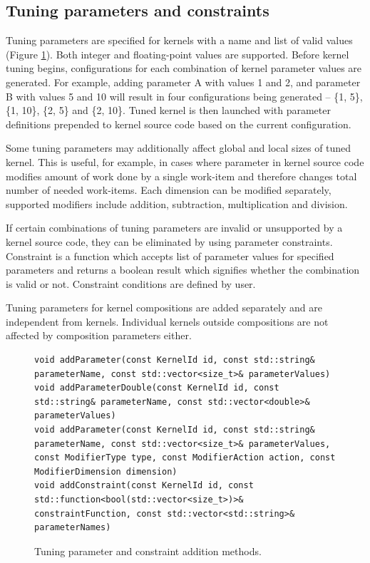 \documentclass
[
    digital, %
    oneside, %
    table, %
    nolof, %
    nolot, %
    nocover %
]{fithesis3}
\begin{document}
\subsection{Tuning parameters and constraints}
\label{ktt-tuning-parameters}
Tuning parameters are specified for kernels with a name and list of valid values (Figure \ref{ktt-parameter-methods}). Both integer and floating-point
values are supported. Before kernel tuning begins, configurations for each combination of kernel parameter values are generated. For example, adding
parameter A with values 1 and 2, and parameter B with values 5 and 10 will result in four configurations being generated -- \{1, 5\}, \{1, 10\}, \{2, 5\}
and \{2, 10\}. Tuned kernel is then launched with parameter definitions prepended to kernel source code based on the current configuration.

Some tuning parameters may additionally affect global and local sizes of tuned kernel. This is useful, for example, in cases where parameter in kernel
source code modifies amount of work done by a single work-item and therefore changes total number of needed work-items. Each dimension can be modified
separately, supported modifiers include addition, subtraction, multiplication and division.

If certain combinations of tuning parameters are invalid or unsupported by a kernel source code, they can be eliminated by using parameter constraints.
Constraint is a function which accepts list of parameter values for specified parameters and returns a boolean result which signifies whether the
combination is valid or not. Constraint conditions are defined by user.

Tuning parameters for kernel compositions are added separately and are independent from kernels. Individual kernels outside compositions are not affected
by composition parameters either.

\begin{figure}
\begin{adjustwidth}{-1cm}{-1cm}
\begin{lstlisting}
void addParameter(const KernelId id, const std::string& parameterName, const std::vector<size_t>& parameterValues)
void addParameterDouble(const KernelId id, const std::string& parameterName, const std::vector<double>& parameterValues)
void addParameter(const KernelId id, const std::string& parameterName, const std::vector<size_t>& parameterValues, const ModifierType type, const ModifierAction action, const ModifierDimension dimension)
void addConstraint(const KernelId id, const std::function<bool(std::vector<size_t>)>& constraintFunction, const std::vector<std::string>& parameterNames)
\end{lstlisting}
\caption{Tuning parameter and constraint addition methods.}
\label{ktt-parameter-methods}
\end{adjustwidth}
\end{figure}
\end{document}
